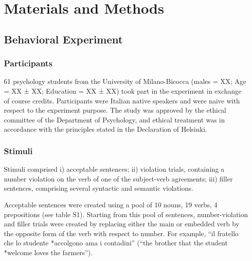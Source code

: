\section{Materials and Methods}

\subsection{Behavioral Experiment}
\subsubsection{Participants}
61 psychology students from the University of Milano-Bicocca (males = XX; Age = XX ± XX; Education = XX ± XX) took part in the experiment in exchange of course credits. Participants were Italian native speakers and were naive with respect to the experiment purpose. The study was approved by the ethical committee of the Department of Psychology, and ethical treatment was in accordance with the principles stated in the Declaration of Helsinki.

\subsubsection{Stimuli}
Stimuli comprised i) acceptable sentences; ii) violation trials, containing a number violation on the verb of one of the subject-verb agreements; iii) filler sentences, comprising several syntactic and semantic violations. 

Acceptable sentences were created using a pool of 10 nouns, 19 verbs, 4 prepositions (see table S1).
Starting from this pool of sentences, number-violation and filler trials were created by replacing either the main or embedded verb by the opposite form of the verb with respect to number. For example, ``il fratello che lo studente *accolgono ama i contadini'' (``the brother that the student *welcome loves the farmers'').

